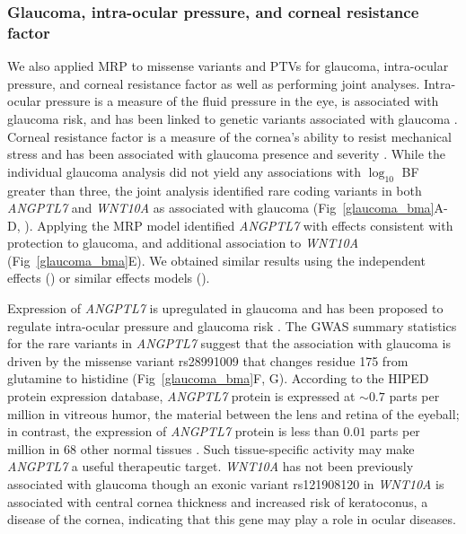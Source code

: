 \subsubsection*{Glaucoma, intra-ocular pressure, and corneal resistance factor}
We also applied MRP to missense variants and PTVs for glaucoma, intra-ocular pressure, and corneal resistance factor as well as performing joint analyses. Intra-ocular pressure is a measure of the fluid pressure in the eye, is associated with glaucoma risk, and has been linked to genetic variants associated with glaucoma \cite{doi:10.1001/jama.2014.3192}. Corneal resistance factor is a measure of the cornea's ability to resist mechanical stress and has been associated with glaucoma presence and severity \cite{CXO:CXO414, MANSOURI2012419, GriseDulac:2012bo}. While the individual glaucoma analysis did not yield any associations with $\log_{10}$ BF greater than three, the joint analysis identified rare coding variants in both \textit{ANGPTL7} and \textit{WNT10A} as associated with glaucoma (Fig~\ref{glaucoma_bma}A-D, ). Applying the MRP model identified \textit{ANGPTL7} with effects consistent with protection to glaucoma, and additional association to \textit{WNT10A} (Fig~\ref{glaucoma_bma}E). We obtained similar results using the independent effects () or similar effects models (). 

Expression of \textit{ANGPTL7} is upregulated in glaucoma and has been proposed to regulate intra-ocular pressure and glaucoma risk \cite{Comes:2011ex, Kuchtey:2008ek}. The GWAS summary statistics for the rare variants in \textit{ANGPTL7} suggest that the association with glaucoma is driven by the missense variant rs28991009 that changes residue 175 from glutamine to histidine (Fig~\ref{glaucoma_bma}F, G). According to the HIPED protein expression database, \textit{ANGPTL7} protein is expressed at $\sim0.7$ parts per million in vitreous humor, the material between the lens and retina of the eyeball; in contrast, the expression of \textit{ANGPTL7} protein is less than $0.01$ parts per million in 68 other normal tissues \cite{Fishilevich:2016hx}. Such tissue-specific activity may make \textit{ANGPTL7} a useful therapeutic target. \textit{WNT10A} has not been previously associated with glaucoma though an exonic variant rs121908120 in \textit{WNT10A} is associated with central cornea thickness and increased risk of keratoconus, a disease of the cornea, indicating that this gene may play a role in ocular diseases.

